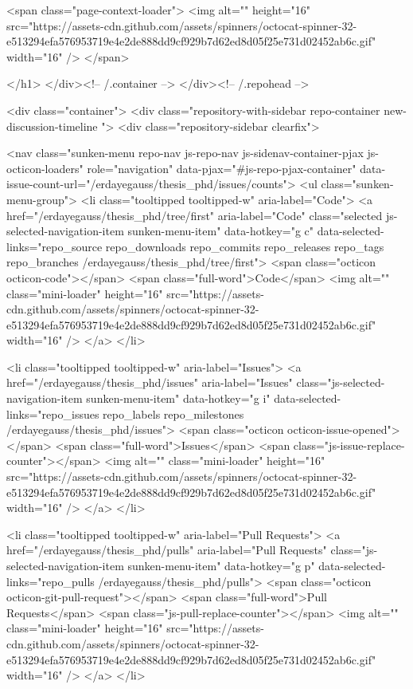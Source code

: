           <span class="page-context-loader">
            <img alt="" height="16" src="https://assets-cdn.github.com/assets/spinners/octocat-spinner-32-e513294efa576953719e4e2de888dd9cf929b7d62ed8d05f25e731d02452ab6c.gif" width="16" />
          </span>

        </h1>
      </div><!-- /.container -->
    </div><!-- /.repohead -->

    <div class="container">
      <div class="repository-with-sidebar repo-container new-discussion-timeline  ">
        <div class="repository-sidebar clearfix">
            
<nav class="sunken-menu repo-nav js-repo-nav js-sidenav-container-pjax js-octicon-loaders"
     role="navigation"
     data-pjax="#js-repo-pjax-container"
     data-issue-count-url="/erdayegauss/thesis_phd/issues/counts">
  <ul class="sunken-menu-group">
    <li class="tooltipped tooltipped-w" aria-label="Code">
      <a href="/erdayegauss/thesis_phd/tree/first" aria-label="Code" class="selected js-selected-navigation-item sunken-menu-item" data-hotkey="g c" data-selected-links="repo_source repo_downloads repo_commits repo_releases repo_tags repo_branches /erdayegauss/thesis_phd/tree/first">
        <span class="octicon octicon-code"></span> <span class="full-word">Code</span>
        <img alt="" class="mini-loader" height="16" src="https://assets-cdn.github.com/assets/spinners/octocat-spinner-32-e513294efa576953719e4e2de888dd9cf929b7d62ed8d05f25e731d02452ab6c.gif" width="16" />
</a>    </li>

      <li class="tooltipped tooltipped-w" aria-label="Issues">
        <a href="/erdayegauss/thesis_phd/issues" aria-label="Issues" class="js-selected-navigation-item sunken-menu-item" data-hotkey="g i" data-selected-links="repo_issues repo_labels repo_milestones /erdayegauss/thesis_phd/issues">
          <span class="octicon octicon-issue-opened"></span> <span class="full-word">Issues</span>
          <span class="js-issue-replace-counter"></span>
          <img alt="" class="mini-loader" height="16" src="https://assets-cdn.github.com/assets/spinners/octocat-spinner-32-e513294efa576953719e4e2de888dd9cf929b7d62ed8d05f25e731d02452ab6c.gif" width="16" />
</a>      </li>

    <li class="tooltipped tooltipped-w" aria-label="Pull Requests">
      <a href="/erdayegauss/thesis_phd/pulls" aria-label="Pull Requests" class="js-selected-navigation-item sunken-menu-item" data-hotkey="g p" data-selected-links="repo_pulls /erdayegauss/thesis_phd/pulls">
          <span class="octicon octicon-git-pull-request"></span> <span class="full-word">Pull Requests</span>
          <span class="js-pull-replace-counter"></span>
          <img alt="" class="mini-loader" height="16" src="https://assets-cdn.github.com/assets/spinners/octocat-spinner-32-e513294efa576953719e4e2de888dd9cf929b7d62ed8d05f25e731d02452ab6c.gif" width="16" />
</a>    </li>


